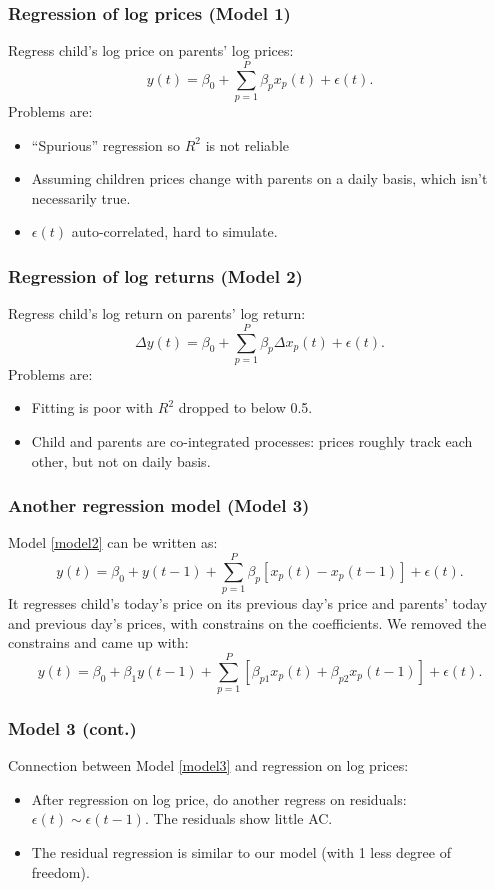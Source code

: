 \documentclass[10pt]{beamer}
\begin{document}
\frame
{
  \frametitle{Regression of log prices (Model 1)}

Regress child's log price on parents' log prices:
\begin{equation}
y(t)=\beta_0 + \sum_{p=1}^P \beta_p x_p(t) + \epsilon(t).
\label{model1}
\end{equation}
Problems are:
\begin{itemize}
\item ``Spurious'' regression so $R^2$ is not reliable
\item Assuming children prices change with parents 
on a daily basis, which isn't necessarily true.
\item $\epsilon(t)$ auto-correlated, hard to simulate.
\end{itemize}
}

\frame
{
  \frametitle{Regression of log returns (Model 2)}
Regress child's log return on parents' log return:
\begin{equation}
\Delta y(t)=\beta_0 + \sum_{p=1}^P \beta_p \Delta x_p(t) + \epsilon(t).
\label{model2}
\end{equation}
Problems are:
\begin{itemize}
\item Fitting is poor  with $R^2$ dropped to below 0.5.
\item Child and parents are co-integrated processes: 
prices roughly track each other, but not on daily basis.
\end{itemize}
}

\frame
{
  \frametitle{Another regression model (Model 3)}
Model \ref{model2} can  be written as:
\[ y(t)=\beta_0 + y(t-1) + \sum_{p=1}^P \beta_p [x_p(t)-x_{p}(t-1)] + \epsilon(t). \]
It regresses child's today's price on
its previous day's price  and parents' today
and previous day's prices, with constrains on the coefficients. 
\vspace{15pt}
We removed the constrains and came up with:
\begin{equation}
  y(t)=\beta_0 + \beta_1 y(t-1) +
\sum_{p=1}^P [\beta_{p1} x_p(t) + \beta_{p2} x_p(t-1) ] + \epsilon(t).
\label{model3}
\end{equation}
}


\frame
{
  \frametitle{Model 3 (cont.)}
Connection between Model \ref{model3} and regression on log prices:
\begin{itemize}
\item After regression on log price, do another regress on residuals:
$\epsilon(t) \sim \epsilon(t-1)$. The residuals show little AC.
\item The residual regression is similar to our model 
(with 1 less degree of freedom). 
\end{itemize}
}
\end{document}
